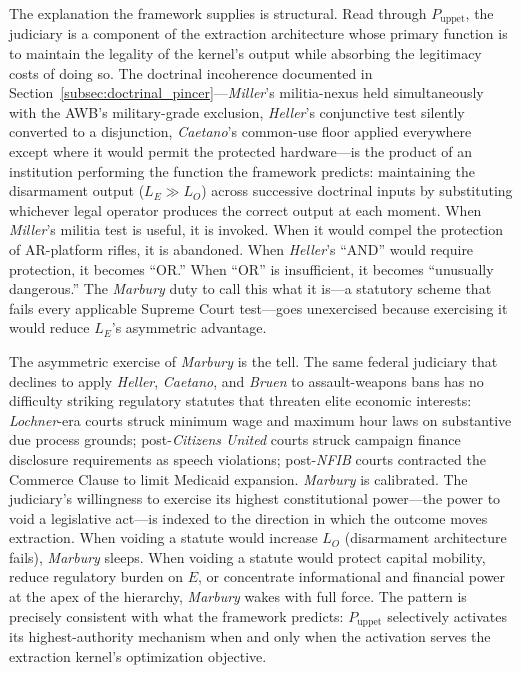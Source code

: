 The explanation the framework supplies is structural. Read through $P_{\text{uppet}}$, the judiciary is a component of the extraction architecture whose primary function is to maintain the legality of the kernel's output while absorbing the legitimacy costs of doing so. The doctrinal incoherence documented in Section~\ref{subsec:doctrinal_pincer}---\textit{Miller}'s militia-nexus held simultaneously with the AWB's military-grade exclusion, \textit{Heller}'s conjunctive test silently converted to a disjunction, \textit{Caetano}'s common-use floor applied everywhere except where it would permit the protected hardware---is the product of an institution performing the function the framework predicts: maintaining the disarmament output ($L_E \gg L_O$) across successive doctrinal inputs by substituting whichever legal operator produces the correct output at each moment. When \textit{Miller}'s militia test is useful, it is invoked. When it would compel the protection of AR-platform rifles, it is abandoned. When \textit{Heller}'s ``AND'' would require protection, it becomes ``OR.'' When ``OR'' is insufficient, it becomes ``unusually dangerous.'' The \textit{Marbury} duty to call this what it is---a statutory scheme that fails every applicable Supreme Court test---goes unexercised because exercising it would reduce $L_E$'s asymmetric advantage.

The asymmetric exercise of \textit{Marbury} is the tell. The same federal judiciary that declines to apply \textit{Heller}, \textit{Caetano}, and \textit{Bruen} to assault-weapons bans has no difficulty striking regulatory statutes that threaten elite economic interests: \textit{Lochner}-era courts struck minimum wage and maximum hour laws on substantive due process grounds; post-\textit{Citizens United} courts struck campaign finance disclosure requirements as speech violations; post-\textit{NFIB} courts contracted the Commerce Clause to limit Medicaid expansion. \textit{Marbury} is calibrated. The judiciary's willingness to exercise its highest constitutional power---the power to void a legislative act---is indexed to the direction in which the outcome moves extraction. When voiding a statute would increase $L_O$ (disarmament architecture fails), \textit{Marbury} sleeps. When voiding a statute would protect capital mobility, reduce regulatory burden on $E$, or concentrate informational and financial power at the apex of the hierarchy, \textit{Marbury} wakes with full force. The pattern is precisely consistent with what the framework predicts: $P_{\text{uppet}}$ selectively activates its highest-authority mechanism when and only when the activation serves the extraction kernel's optimization objective.

